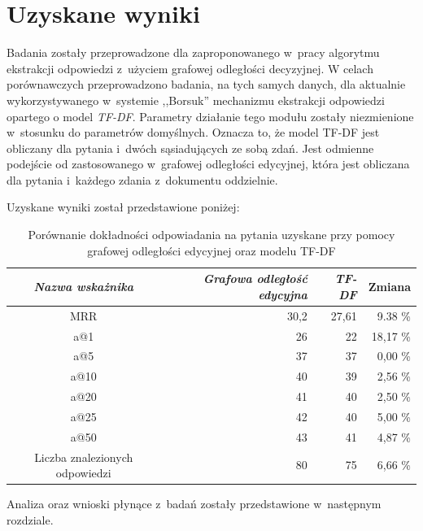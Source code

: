 \documentclass[a4paper, twoside, 12pt]{report}
\begin{document}
    \section{Uzyskane wyniki}
        Badania zostały przeprowadzone dla zaproponowanego w~pracy algorytmu ekstrakcji odpowiedzi z~użyciem
        grafowej odległości decyzyjnej. W celach porównawczych przeprowadzono badania, na tych samych danych,
        dla aktualnie wykorzystywanego w~systemie ,,Borsuk'' mechanizmu ekstrakcji odpowiedzi opartego o model \emph{TF-DF}.
        Parametry działanie tego modułu zostały niezmienione w~stosunku do parametrów domyślnych. Oznacza to, że model
        TF-DF jest obliczany dla pytania i~dwóch sąsiadujących ze sobą zdań. Jest odmienne podejście od zastosowanego
        w~grafowej odległości edycyjnej, która jest obliczana dla pytania i~każdego zdania z~dokumentu oddzielnie.

        Uzyskane wyniki został przedstawione poniżej:

        \begin{table}[h]
            \centering
            \begin{tabular}{ | c | r | r | r | }
              \hline
              \emph{Nazwa wskażnika} & \emph{Grafowa odległość edycyjna} & \emph{TF-DF} & Zmiana \\ \hline
              MRR & 30,2 & 27,61 & 9.38 \% \\ \hline
              a@1 & 26 & 22 & 18,17 \% \\ \hline
              a@5 & 37 & 37 & 0,00 \% \\ \hline
              a@10 & 40 & 39 & 2,56 \% \\ \hline
              a@20 & 41 & 40 & 2,50 \% \\ \hline
              a@25 & 42 & 40 & 5,00 \% \\ \hline
              a@50 & 43 & 41 & 4,87 \% \\ \hline
              Liczba znalezionych odpowiedzi & 80 & 75 & 6,66 \% \\ \hline
            \end{tabular}
            \caption{Porównanie dokładności odpowiadania na pytania uzyskane przy pomocy grafowej odległości edycyjnej
            oraz modelu TF-DF}
            \label{TAB:RESULTS}
        \end{table}

        Analiza oraz wnioski płynące z~badań zostały przedstawione w~następnym rozdziale.
\end{document}

